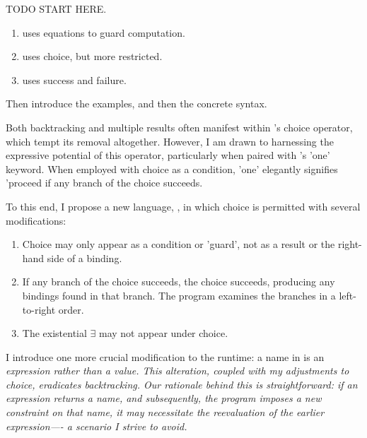 \documentclass[manuscript,screen,review, 12pt, nonacm]{acmart}
\begin{document}
        TODO START HERE. 

        \begin{enumerate}
          \item \VMinus uses equations to guard computation. 
          \item \VMinus uses choice, but more restricted. 
          \item \VMinus uses success and failure. 
        \end{enumerate}
        
        Then introduce the examples, and then the concrete syntax. 

        Both backtracking and multiple results often
        manifest within \VC's choice operator, which tempt its removal
        altogether. However, I am drawn to harnessing the expressive potential
        of this operator, particularly when paired with \VC's 'one' keyword.
        When employed with choice as a condition, 'one' elegantly signifies
        'proceed if any branch of the choice succeeds. 
        
        To this end, I propose a new language, \VMinus, in which choice is
        permitted with several modifications:

        \begin{enumerate}
        \item Choice may only appear as a condition or 'guard', not as a result
        or the right-hand side of a binding.
        \item If any branch of the choice succeeds, the choice succeeds,
        producing any bindings found in that branch. The program examines the
        branches in a left-to-right order.
        \item The existential $\exists$ may not appear under choice.
        \end{enumerate}

        I introduce one more crucial modification to the \VC runtime: a name in
        \VMinus is an \it{expression} rather than a \it{value}. This alteration,
        coupled with my adjustments to choice, eradicates backtracking. Our
        rationale behind this is straightforward: if an expression returns a
        name, and subsequently, the program imposes a new constraint on that
        name, it may necessitate the reevaluation of the earlier expression—- a
        scenario I strive to avoid. 
        
\end{document}
